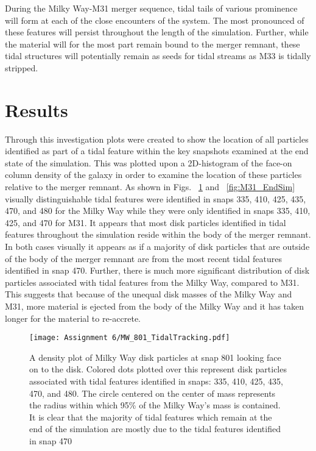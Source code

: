 \documentclass[fleqn,usenatbib]{mnras}
\begin{document}
During the Milky Way-M31 merger sequence, tidal tails of various prominence will form at each of the close encounters of the system. 
The most pronounced of these features will persist throughout the length of the simulation. 
Further, while the material will for the most part remain bound to the merger remnant, these tidal structures will potentially remain as seeds for tidal streams as M33 is tidally stripped.

\section{Results}
Through this investigation plots were created to show the location of all particles identified as part of a tidal feature within the key snapshots examined at the end state of the simulation. This was plotted upon a 2D-histogram of the face-on column density of the galaxy in order to examine the location of these particles relative to the merger remnant. As shown in Figs. ~\ref{fig:MW_EndSim} and ~\ref{fig:M31_EndSim} visually distinguishable tidal features were identified in snaps 335, 410, 425, 435, 470, and 480 for the Milky Way while they were only identified in snaps 335, 410, 425, and 470 for M31. It appears that most disk particles identified in tidal features throughout the simulation reside within the body of the merger remnant. In both cases visually it appears as if a majority of disk particles that are outside of the body of the merger remnant are from the most recent tidal features identified in snap 470. Further, there is much more significant distribution of disk particles associated with tidal features from the Milky Way, compared to M31. This suggests that because of the unequal disk masses of the Milky Way and M31, more material is ejected from the body of the Milky Way and it has taken longer for the material to re-accrete.

\begin{figure}
	\texttt{[image: Assignment 6/MW\_801\_TidalTracking.pdf]}
    \caption{A density plot of Milky Way disk particles at snap 801 looking face on to the disk. Colored dots plotted over this represent disk particles associated with tidal features identified in snaps: 335, 410, 425, 435, 470, and 480. The circle centered on the center of mass represents the radius within which 95\% of the Milky Way's mass is contained. It is clear that the majority of tidal features which remain at the end of the simulation are mostly due to the tidal features identified in snap 470}
    \label{fig:MW_EndSim}
\end{figure}
\end{document}
